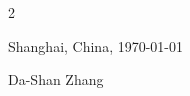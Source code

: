 \begin{paracol}{2}
\begin{rightcolumn}
\vspace{8pt}
Shanghai, China, \today     \hspace{1cm}   \hrulefill

\hspace*{30mm}\phantom{Shanghai, China, \today }Da-Shan Zhang

\end{rightcolumn}
\end{paracol}
